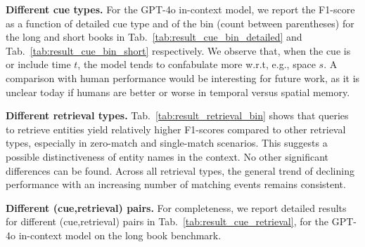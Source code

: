 \documentclass{article}
\begin{document}
\noindent \textbf{Different cue types.} For the GPT-4o in-context model, 
we report the F1-score as a function of detailed cue type and of the bin (count between parentheses) for the long and short books in Tab.~\ref{tab:result_cue_bin_detailed} and  Tab.~\ref{tab:result_cue_bin_short} respectively. We observe that, when the cue is or include time $t$, the model tends to confabulate more w.r.t, e.g., space $s$. A comparison with human performance would be interesting for future work, as it is unclear today if humans are better or worse in temporal versus spatial memory. 


\noindent \textbf{Different retrieval types.}\label{app:eval:retrieval_type}
Tab.~\ref{tab:result_retrieval_bin} shows that queries to retrieve entities yield relatively higher F1-scores compared to other retrieval types, especially in zero-match and single-match scenarios. This suggests a possible distinctiveness of entity names in the context. No other significant differences can be found. Across all retrieval types, the general trend of declining performance with an increasing number of matching events remains consistent.

\noindent \textbf{Different (cue,retrieval) pairs.}
For completeness, we report detailed results for different (cue,retrieval) pairs in Tab.~\ref{tab:result_cue_retrieval}, for the GPT-4o in-context model on the long book benchmark.
\end{document}
